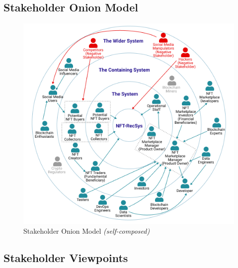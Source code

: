 \subsection{Stakeholder Onion Model}
\begin{figure}[h!]
\centering
\includegraphics[width=\textwidth]{images/SRS/stakeholder-onion-diagram.png}
\caption{Stakeholder Onion Model \textit{(self-composed)}}
\label{fig:stakeholder-onion}
\end{figure}

\subsection{Stakeholder Viewpoints}

